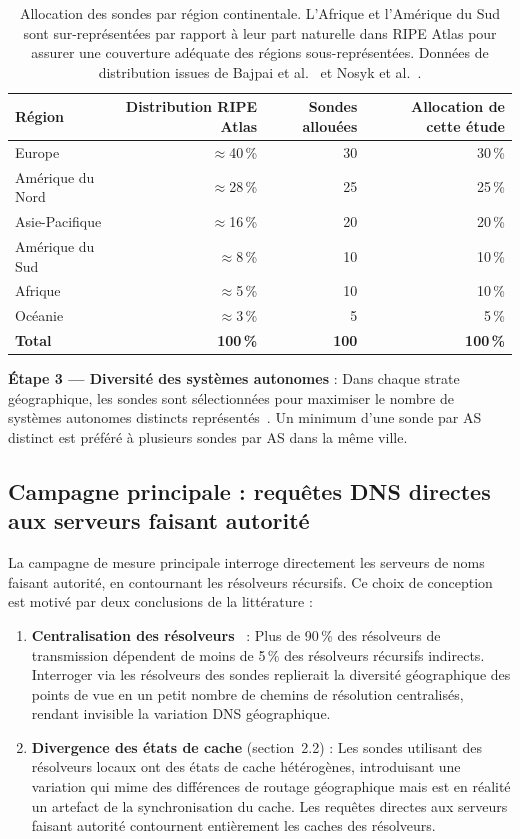 \begin{table}[H]
\centering
\small
\begin{tabular}{l r r r}
\toprule
\textbf{Région} & \textbf{Distribution RIPE Atlas} & \textbf{Sondes allouées} & \textbf{Allocation de cette étude} \\
\midrule
Europe        & $\approx$40\,\% & 30 & 30\,\% \\
Amérique du Nord & $\approx$28\,\% & 25 & 25\,\% \\
Asie-Pacifique  & $\approx$16\,\% & 20 & 20\,\% \\
Amérique du Sud & $\approx$8\,\%  & 10 & 10\,\% \\
Afrique        & $\approx$5\,\%  & 10 & 10\,\% \\
Océanie       & $\approx$3\,\%  &  5 &  5\,\% \\
\midrule
\textbf{Total} & \textbf{100\,\%} & \textbf{100} & \textbf{100\,\%} \\
\bottomrule
\end{tabular}
\caption{Allocation des sondes par région continentale. L'Afrique et l'Amérique du Sud sont sur-représentées par rapport à leur part naturelle dans RIPE Atlas pour assurer une couverture adéquate des régions sous-représentées. Données de distribution issues de Bajpai et al.~\cite{Bajpai2017} et Nosyk et al.~\cite{Nosyk2024}.}
\label{tab:probe_allocation}
\end{table}

\textbf{Étape 3 --- Diversité des systèmes autonomes} : Dans chaque strate géographique, les sondes sont sélectionnées pour maximiser le nombre de systèmes autonomes distincts représentés~\cite{Bajpai2017}. Un minimum d'une sonde par AS distinct est préféré à plusieurs sondes par AS dans la même ville.

\subsection{Campagne principale : requêtes DNS directes aux serveurs faisant autorité}
\label{subsec:3.3.2}

La campagne de mesure principale interroge directement les serveurs de noms faisant autorité, en contournant les résolveurs récursifs. Ce choix de conception est motivé par deux conclusions de la littérature :

\begin{enumerate}
  \item \textbf{Centralisation des résolveurs}~\cite{Xu2023} : Plus de 90\,\% des résolveurs de transmission dépendent de moins de 5\,\% des résolveurs récursifs indirects. Interroger via les résolveurs des sondes replierait la diversité géographique des points de vue en un petit nombre de chemins de résolution centralisés, rendant invisible la variation DNS géographique.
  \item \textbf{Divergence des états de cache} (section~2.2) : Les sondes utilisant des résolveurs locaux ont des états de cache hétérogènes, introduisant une variation qui mime des différences de routage géographique mais est en réalité un artefact de la synchronisation du cache. Les requêtes directes aux serveurs faisant autorité contournent entièrement les caches des résolveurs.
\end{enumerate}

